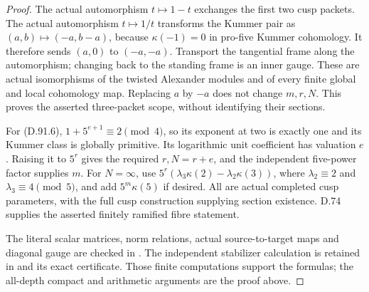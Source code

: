 \begin{proof}
The actual automorphism \(t\mapsto1-t\) exchanges the
first two cusp packets. The actual automorphism
\(t\mapsto1/t\) transforms the Kummer pair as
\((a,b)\mapsto(-a,b-a)\), because \(\kappa(-1)=0\)
in pro-five Kummer cohomology. It therefore sends
\((a,0)\) to \((-a,-a)\). Transport the tangential
frame along the automorphism; changing back to the standing
frame is an inner gauge. These are actual isomorphisms of
the twisted Alexander modules and of every finite global
and local cohomology map. Replacing \(a\) by \(-a\)
does not change \(m,r,N\). This proves the asserted
three-packet scope, without identifying their sections.

For (D.91.6), \(1+5^{e+1}\equiv2\pmod4\), so
its exponent at two is exactly one and its Kummer class
is globally primitive. Its logarithmic unit coefficient
has valuation \(e\). Raising it to \(5^r\) gives
the required \(r,N=r+e\), and the independent five-power
factor supplies \(m\). For \(N=\infty\), use
\(5^r(\lambda_3\kappa(2)-\lambda_2\kappa(3))\),
where \(\lambda_2\equiv2\) and \(\lambda_3\equiv4\pmod5\),
and add \(5^m\kappa(5)\) if desired. All are actual
completed cusp parameters, with the full cusp construction
supplying section existence. D.74 supplies the asserted
finitely ramified fibre statement.

The literal scalar matrices, norm relations, actual
source-to-target maps and diagonal gauge are checked in
.
The independent stabilizer calculation is retained in
 and its
exact certificate. Those finite computations support the
formulas; the all-depth compact and arithmetic arguments
are the proof above.
\end{proof}
